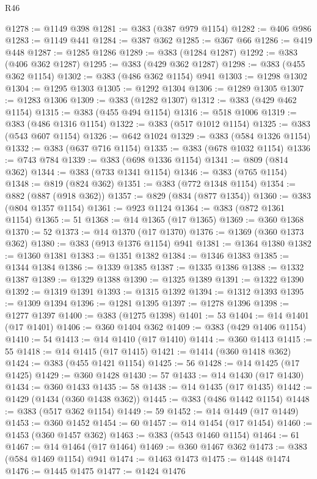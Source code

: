 \begin{lexlean}{R46}
\begin{coremodule}
@1278 := @1149 @398
@1281 := @383 (@387 @979 @1154)
@1282 := @406 @986
@1283 := @1149 @441
@1284 := @387 @362
@1285 := @367 @66
@1286 := @419 @448
@1287 := @1285 @1286
@1289 := @383 (@1284 @1287)
@1292 := @383 (@406 @362 @1287)
@1295 := @383 (@429 @362 @1287)
@1298 := @383 (@455 @362 @1154)
@1302 := @383 (@486 @362 @1154) @941
@1303 := @1298 @1302
@1304 := @1295 @1303
@1305 := @1292 @1304
@1306 := @1289 @1305
@1307 := @1283 @1306
@1309 := @383 (@1282 @1307)
@1312 := @383 (@429 @462 @1154)
@1315 := @383 (@455 @494 @1154)
@1316 := @518 @1006
@1319 := @383 (@486 @1316 @1154)
@1322 := @383 (@517 @1012 @1154)
@1325 := @383 (@543 @607 @1154)
@1326 := @642 @1024
@1329 := @383 (@584 @1326 @1154)
@1332 := @383 (@637 @716 @1154)
@1335 := @383 (@678 @1032 @1154)
@1336 := @743 @784
@1339 := @383 (@698 @1336 @1154)
@1341 := @809 (@814 @362)
@1344 := @383 (@733 @1341 @1154)
@1346 := @383 (@765 @1154)
@1348 := @819 (@824 @362)
@1351 := @383 (@772 @1348 @1154)
@1354 := @882 (@887 (@918 @362))
@1357 := @829 (@834 (@877 @1354))
@1360 := @383 (@804 @1357 @1154)
@1361 := @923 @1124
@1364 := @383 (@872 @1361 @1154)
@1365 := 51
@1368 := @14 @1365 (@17 @1365)
@1369 := @360 @1368
@1370 := 52
@1373 := @14 @1370 (@17 @1370)
@1376 := @1369 (@360 @1373 @362)
@1380 := @383 (@913 @1376 @1154) @941
@1381 := @1364 @1380
@1382 := @1360 @1381
@1383 := @1351 @1382
@1384 := @1346 @1383
@1385 := @1344 @1384
@1386 := @1339 @1385
@1387 := @1335 @1386
@1388 := @1332 @1387
@1389 := @1329 @1388
@1390 := @1325 @1389
@1391 := @1322 @1390
@1392 := @1319 @1391
@1393 := @1315 @1392
@1394 := @1312 @1393
@1395 := @1309 @1394
@1396 := @1281 @1395
@1397 := @1278 @1396
@1398 := @1277 @1397
@1400 := @383 (@1275 @1398)
@1401 := 53
@1404 := @14 @1401 (@17 @1401)
@1406 := @360 @1404 @362
@1409 := @383 (@429 @1406 @1154)
@1410 := 54
@1413 := @14 @1410 (@17 @1410)
@1414 := @360 @1413
@1415 := 55
@1418 := @14 @1415 (@17 @1415)
@1421 := @1414 (@360 @1418 @362)
@1424 := @383 (@455 @1421 @1154)
@1425 := 56
@1428 := @14 @1425 (@17 @1425)
@1429 := @360 @1428
@1430 := 57
@1433 := @14 @1430 (@17 @1430)
@1434 := @360 @1433
@1435 := 58
@1438 := @14 @1435 (@17 @1435)
@1442 := @1429 (@1434 (@360 @1438 @362))
@1445 := @383 (@486 @1442 @1154)
@1448 := @383 (@517 @362 @1154)
@1449 := 59
@1452 := @14 @1449 (@17 @1449)
@1453 := @360 @1452
@1454 := 60
@1457 := @14 @1454 (@17 @1454)
@1460 := @1453 (@360 @1457 @362)
@1463 := @383 (@543 @1460 @1154)
@1464 := 61
@1467 := @14 @1464 (@17 @1464)
@1469 := @360 @1467 @362
@1473 := @383 (@584 @1469 @1154) @941
@1474 := @1463 @1473
@1475 := @1448 @1474
@1476 := @1445 @1475
@1477 := @1424 @1476

\end{coremodule}
\end{lexlean}
